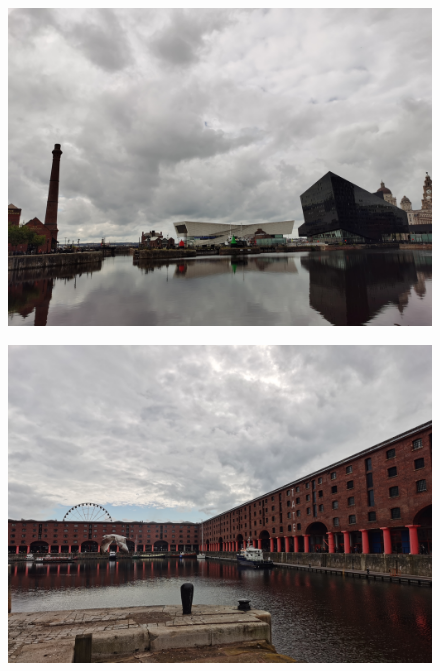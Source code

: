 \documentclass[11pt]{article}
\begin{document}
\begin{figure}[H]
    \centering
    \includegraphics[width=\textwidth]{1R.jpg}
\end{figure}

\begin{figure}[H]
    \centering
    \includegraphics[width=\textwidth]{1S.jpg}
\end{figure}
\end{document}
